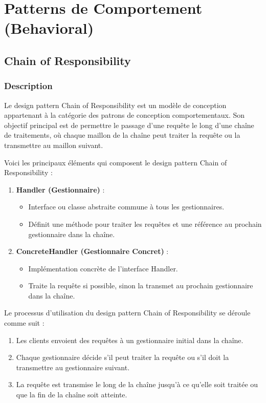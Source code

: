 \section{Patterns de Comportement (Behavioral)}

\subsection{Chain of Responsibility}

\subsubsection{Description}

Le design pattern Chain of Responsibility est un modèle de conception appartenant à la catégorie des patrons de conception comportementaux. Son objectif principal est de permettre le passage d'une requête le long d'une chaîne de traitements, où chaque maillon de la chaîne peut traiter la requête ou la transmettre au maillon suivant.

Voici les principaux éléments qui composent le design pattern Chain of Responsibility :

\begin{enumerate}[leftmargin=*,labelsep=3mm]
    \item \textbf{Handler (Gestionnaire)} :
    \begin{itemize}
        \item Interface ou classe abstraite commune à tous les gestionnaires.
        \item Définit une méthode pour traiter les requêtes et une référence au prochain gestionnaire dans la chaîne.
    \end{itemize}
    
    \item \textbf{ConcreteHandler (Gestionnaire Concret)} :
    \begin{itemize}
        \item Implémentation concrète de l'interface Handler.
        \item Traite la requête si possible, sinon la transmet au prochain gestionnaire dans la chaîne.
    \end{itemize}
\end{enumerate}

Le processus d'utilisation du design pattern Chain of Responsibility se déroule comme suit :

\begin{enumerate}[leftmargin=*,labelsep=3mm]
    \item Les clients envoient des requêtes à un gestionnaire initial dans la chaîne.
    \item Chaque gestionnaire décide s'il peut traiter la requête ou s'il doit la transmettre au gestionnaire suivant.
    \item La requête est transmise le long de la chaîne jusqu'à ce qu'elle soit traitée ou que la fin de la chaîne soit atteinte.
\end{enumerate}

